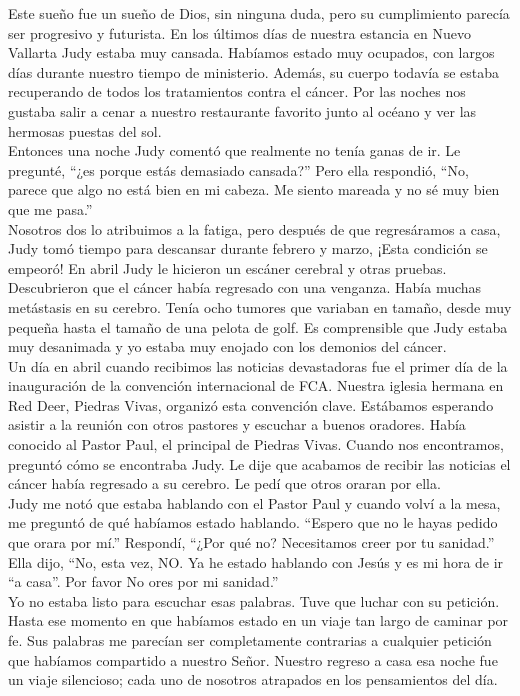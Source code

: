 \documentclass[twoside, 12pt]{book}
\begin{document}
Este sueño fue un sueño de Dios, sin ninguna duda, pero su cumplimiento parecía ser progresivo y futurista. En los últimos días de nuestra estancia en Nuevo Vallarta Judy estaba muy cansada. Habíamos estado muy ocupados, con largos días durante nuestro tiempo de ministerio. Además, su cuerpo todavía se estaba recuperando de todos los tratamientos contra el cáncer. Por las noches nos gustaba salir a cenar a nuestro restaurante favorito junto al océano y ver las hermosas puestas del sol.\\
 
Entonces una noche Judy comentó que realmente no tenía ganas de ir. Le pregunté, “¿es porque estás demasiado cansada?” Pero ella respondió, “No, parece que algo no está bien en mi cabeza. Me siento mareada y no sé muy bien que me pasa.”\\
 
Nosotros dos lo atribuimos a la fatiga, pero después de que regresáramos a casa, Judy tomó tiempo para descansar durante febrero y marzo, ¡Esta condición se empeoró! En abril Judy le hicieron un escáner cerebral y otras pruebas. Descubrieron que el cáncer había regresado con una venganza.  Había muchas metástasis en su cerebro.  Tenía ocho tumores que variaban en tamaño, desde muy pequeña hasta el tamaño de una pelota de golf.  Es comprensible que Judy estaba muy desanimada y yo estaba muy enojado con los demonios del cáncer.\\
 
Un día en abril cuando recibimos las noticias devastadoras fue el primer día de la inauguración de la convención internacional de FCA.  Nuestra iglesia hermana en Red Deer, Piedras Vivas, organizó esta convención clave. Estábamos esperando asistir a la reunión con otros pastores y escuchar a buenos oradores. Había conocido al Pastor Paul, el principal de Piedras Vivas. Cuando nos encontramos, preguntó cómo se encontraba Judy. Le dije que acabamos de recibir las noticias el cáncer había regresado a su cerebro. Le pedí que otros oraran por ella.\\
 
Judy me notó que estaba hablando con el Pastor Paul y cuando volví a la mesa, me preguntó de qué habíamos estado hablando. “Espero que no le hayas pedido que orara por mí.” Respondí, “¿Por qué no?  Necesitamos creer por tu sanidad.” Ella dijo, “No, esta vez, NO. Ya he estado hablando con Jesús y es mi hora de ir “a casa”. Por favor No ores por mi sanidad.”\\

Yo no estaba listo para escuchar esas palabras. Tuve que luchar con su petición. Hasta ese momento en que habíamos estado en un viaje tan largo de caminar por fe. Sus palabras me parecían ser completamente contrarias a cualquier petición que habíamos compartido a nuestro Señor. Nuestro regreso a casa esa noche fue un viaje silencioso; cada uno de nosotros atrapados en los pensamientos del día.\\
 
\end{document}
